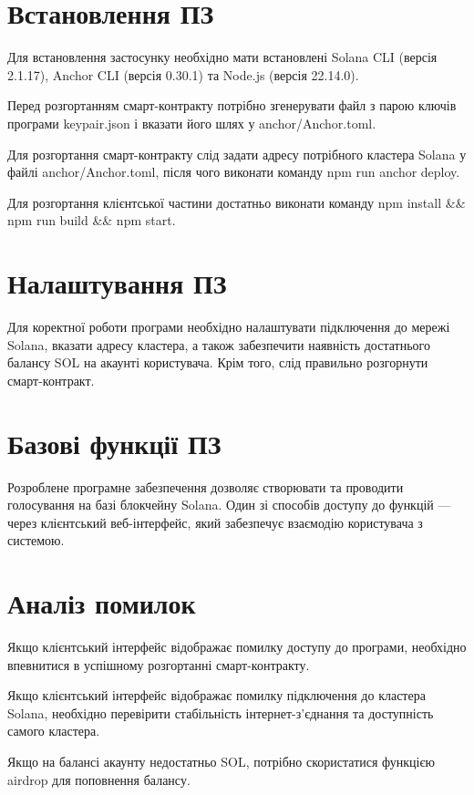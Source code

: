 \documentclass[14pt]{extreport}
\begin{document}
  \section*{Встановлення ПЗ}
  
  Для встановлення застосунку необхідно мати встановлені Solana CLI (версія 2.1.17), Anchor CLI (версія 0.30.1) та Node.js (версія 22.14.0).  

  Перед розгортанням смарт-контракту потрібно згенерувати файл з парою ключів програми keypair.json і вказати його шлях у anchor/Anchor.toml.

  Для розгортання смарт-контракту слід задати адресу потрібного кластера Solana у файлі anchor/Anchor.toml, після чого виконати команду npm run anchor deploy.
  
  Для розгортання клієнтської частини достатньо виконати команду npm install \&\& npm run build \&\& npm start.
  
  \section*{Налаштування ПЗ}
  
  Для коректної роботи програми необхідно налаштувати підключення до мережі Solana, вказати адресу кластера, а також забезпечити наявність достатнього балансу SOL на акаунті користувача. Крім того, слід правильно розгорнути смарт-контракт.
  
  \section*{Базові функції ПЗ}
  
  Розроблене програмне забезпечення дозволяє створювати та проводити голосування на базі блокчейну Solana. Один зі способів доступу до функцій — через клієнтський веб-інтерфейс, який забезпечує взаємодію користувача з системою.
  
  \section*{Аналіз помилок}
  
  Якщо клієнтський інтерфейс відображає помилку доступу до програми, необхідно впевнитися в успішному розгортанні смарт-контракту.
  
  Якщо клієнтський інтерфейс відображає помилку підключення до кластера Solana, необхідно перевірити стабільність інтернет-з’єднання та доступність самого кластера.
  
  Якщо на балансі акаунту недостатньо SOL, потрібно скористатися функцією airdrop для поповнення балансу.
  
\end{document}
